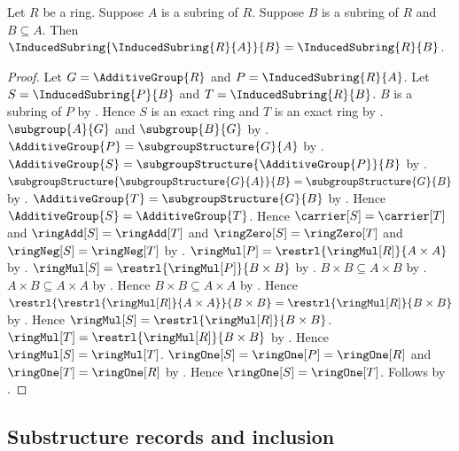 \begin{theorem}\label{iterated_induced_subring}
    Let $R$ be a ring.
    Suppose $A$ is a subring of $R$.
    Suppose $B$ is a subring of $R$ and $B\subseteq A$.
    Then
        $\InducedSubring{\InducedSubring{R}{A}}{B}
            =\InducedSubring{R}{B}$.
\end{theorem}
\begin{proof}
    Let $G=\AdditiveGroup{R}$ and $P=\InducedSubring{R}{A}$.
    Let $S=\InducedSubring{P}{B}$ and $T=\InducedSubring{R}{B}$.
    $B$ is a subring of $P$ by .
    Hence $S$ is an exact ring and $T$ is an exact ring by
        .
    $\subgroup{A}{G}$ and $\subgroup{B}{G}$ by
        .
    $\AdditiveGroup{P}=\subgroupStructure{G}{A}$ by
        .
    $\AdditiveGroup{S}
        =\subgroupStructure{\AdditiveGroup{P}}{B}$ by
        .
    $\subgroupStructure{\subgroupStructure{G}{A}}{B}
        =\subgroupStructure{G}{B}$ by
        .
    $\AdditiveGroup{T}=\subgroupStructure{G}{B}$ by
        .
    Hence $\AdditiveGroup{S}=\AdditiveGroup{T}$.
    Hence $\carrier[S]=\carrier[T]$ and
        $\ringAdd[S]=\ringAdd[T]$ and
        $\ringZero[S]=\ringZero[T]$ and
        $\ringNeg[S]=\ringNeg[T]$ by
        .
    $\ringMul[P]=\restrl{\ringMul[R]}{A\times A}$ by
        .
    $\ringMul[S]=\restrl{\ringMul[P]}{B\times B}$ by
        .
    $B\times B\subseteq A\times B$ by .
    $A\times B\subseteq A\times A$ by .
    Hence $B\times B\subseteq A\times A$ by
        .
    Hence
        $\restrl{\restrl{\ringMul[R]}{A\times A}}{B\times B}
            =\restrl{\ringMul[R]}{B\times B}$ by
        .
    Hence $\ringMul[S]=\restrl{\ringMul[R]}{B\times B}$.
    $\ringMul[T]=\restrl{\ringMul[R]}{B\times B}$ by
        .
    Hence $\ringMul[S]=\ringMul[T]$.
    $\ringOne[S]=\ringOne[P]=\ringOne[R]$ and
        $\ringOne[T]=\ringOne[R]$ by
        .
    Hence $\ringOne[S]=\ringOne[T]$.
    Follows by .
\end{proof}

\subsection{Substructure records and inclusion}

